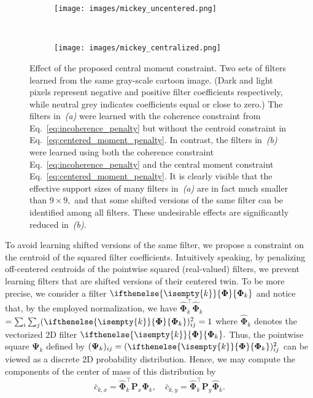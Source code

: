 \documentclass[journal]{IEEEtran}
\newcommand{\Matrix}[1]{\mathbf{#1}}
\newcommand{\AOF}[1]{\ifthenelse{\isempty{#1}}{\boldsymbol{\Phi}}{\boldsymbol{\Phi}_{#1}}}
\begin{document}
\begin{figure}
    \centering
    \begin{subfigure}[b]{0.48\linewidth}
        \texttt{[image: images/mickey\_uncentered.png]}
        \caption{}
        \label{fig:uncentered_filter_set}
    \end{subfigure}
    ~
    \begin{subfigure}[b]{0.48\linewidth}
        \texttt{[image: images/mickey\_centralized.png]}
        \caption{}
    \end{subfigure}
    \caption{
    Effect of the proposed central moment constraint.
    Two sets of filters learned from the same gray-scale cartoon image. 
    (Dark and light pixels represent negative and positive filter coefficients respectively, while neutral grey indicates coefficients equal or close to zero.)
    The filters in~\emph{(a)} were learned with the coherence constraint from Eq.~\eqref{eq:incoherence_penalty} but
    without the centroid constraint in Eq.~\eqref{eq:centered_moment_penalty}. 
    In contrast, the filters in~\emph{(b)} were learned using both 
    the coherence constraint Eq.~\eqref{eq:incoherence_penalty}
    and the central moment constraint Eq.~\eqref{eq:centered_moment_penalty}. 
        It is clearly visible
that the effective support sizes of many filters in~\emph{(a)} are in fact much smaller than $9 \times 9,$
and that some shifted versions of the same filter can be identified among all filters.
These undesirable effects are significantly reduced in~\emph{(b)}.
}
\label{fig:uncetered_and_centralized_filters}
\end{figure}
To avoid learning shifted versions of the same filter, we propose a constraint on the centroid of the squared filter coefficients. 
Intuitively speaking, by penalizing off-centered centroids 
of the pointwise squared (real-valued) filters, 
we prevent learning filters that are shifted versions of their centered twin.
To be more precise, we consider a filter $\AOF{k}$ and notice that, by the employed normalization, we have 
$\hat{\boldsymbol{\Phi}}_{k}^{\top}\hat{\boldsymbol{\Phi}}_{k}$ 
$= \sum_i \sum_j (\AOF{k})_{ij}^2 = 1$ where
$\hat{\boldsymbol{\Phi}}_{k}$ denotes the vectorized 2D filter $\AOF{k}.$
Thus, the pointwise square ${\boldsymbol{\Psi}}_{k}$ defined 
by $(\boldsymbol{\Psi}_{k})_{ij} = (\AOF{k})_{ij}^2$ can be viewed as a discrete 2D probability distribution. Hence, we may compute the components of the center of mass of this distribution by 
\begin{equation}
\bar{c}_{k,x} = \hat{\boldsymbol{\Phi}}_{k}^{\top} \Matrix{P}_x \hat{\boldsymbol{\Phi}}_{k},
\quad
\bar{c}_{k,y} = \hat{\boldsymbol{\Phi}}_{k}^{\top} \Matrix{P}_y \hat{\boldsymbol{\Phi}}_{k}.
\end{equation}
\end{document}

